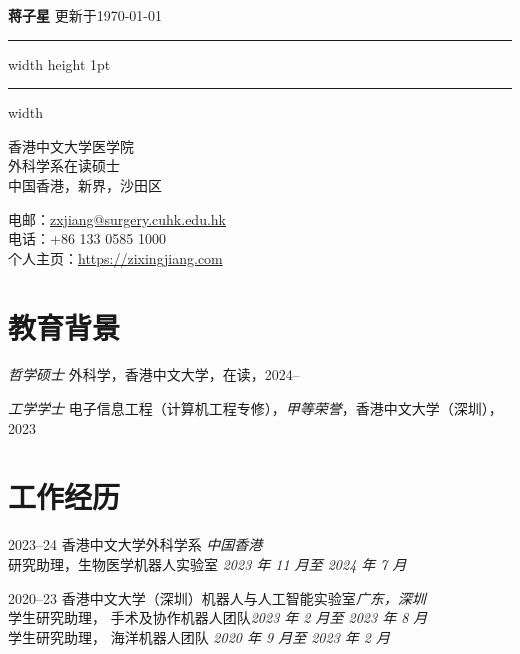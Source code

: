 \documentclass[utf8, 11pt,letterpaper]{report}
\newcommand{\myname}{蒋子星}
\newcommand{\namefont}[1]{{\normalfont\bfseries\LARGE{#1}}}
\begin{document}
\raggedright{}
	
\namefont{\myname} \hfill 更新于\monthyeardate\today
\vspace{0.5em}
\hrule width \hsize height 1pt \kern 1mm \hrule width \hsize 
\vspace{1em}
\begin{minipage}[t]{0.600\textwidth}
	香港中文大学医学院\\
	外科学系在读硕士\\
	中国香港，新界，沙田区
\end{minipage}
\hfil
\begin{minipage}[t]{0.395\textwidth}
	\flushright{}
	电邮：\href{mailto:zxjiang@surgery.cuhk.edu.hk}{zxjiang@surgery.cuhk.edu.hk} \\
	电话：+86 133 0585 1000\\
	个人主页：\href{https://zixingjiang.com}{https://zixingjiang.com}\\
\end{minipage}
	
\section*{教育背景}
\begin{tablist}
	\item[\textit{哲学硕士}]  \tab{}外科学，香港中文大学，在读，2024--\\
	\item[\textit{工学学士}]  \tab{}电子信息工程（计算机工程专修），\textit{甲等荣誉}，香港中文大学（深圳），2023\\
\end{tablist}
	

\section*{工作经历}
	
\begin{tablist}
	\item[2023--24]   \tab{}香港中文大学外科学系 \hfill \textit{中国香港}\\
	研究助理，生物医学机器人实验室 \hfill \emph{\emph{2023} 年 \emph{11} 月至 \emph{2024} 年 \emph{7}  月}
		
	\item[2020--23]   \tab{}香港中文大学（深圳）机器人与人工智能实验室\hfill \textit{广东，深圳}\\
	学生研究助理， 手术及协作机器人团队\hfill \emph{\emph{2023} 年 \emph{2} 月至 \emph{2023} 年 \emph{8}  月}\\
学生研究助理， 海洋机器人团队 \hfill \emph{\emph{2020} 年 \emph{9} 月至 \emph{2023} 年 \emph{2}  月}
\end{tablist}
	
\end{document}
